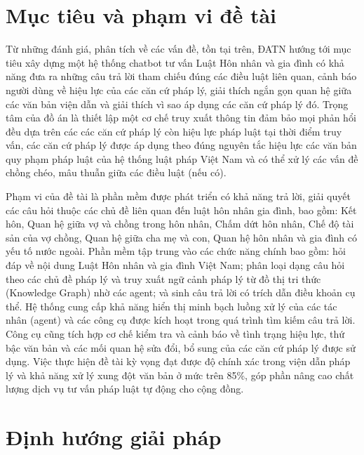 \documentclass[../DoAn.tex]{subfiles}
\begin{document}
\section{Mục tiêu và phạm vi đề tài}
\label{section:1.2}
Từ những đánh giá, phân tích về các vấn đề, tồn tại trên, ĐATN hướng tới mục tiêu xây dựng một hệ thống chatbot tư vấn Luật Hôn nhân và gia đình có khả năng đưa ra những câu trả lời tham chiếu đúng các điều luật liên quan, cảnh báo người dùng về hiệu lực của các căn cứ pháp lý, giải thích ngắn gọn quan hệ giữa các văn bản viện dẫn và giải thích vì sao áp dụng các căn cứ pháp lý đó. Trọng tâm của đồ án là thiết lập một cơ chế truy xuất thông tin đảm bảo mọi phản hổi đều dựa trên các các căn cứ pháp lý còn hiệu lực pháp luật tại thời điểm truy vấn, các căn cứ pháp lý được áp dụng theo đúng nguyên tắc hiệu lực các văn bản quy phạm pháp luật của hệ thống luật pháp Việt Nam và có thể xử lý các vấn đề chồng chéo, mâu thuẫn giữa các điều luật (nếu có).

Phạm vi của đề tài là phần mềm được phát triển có khả năng trả lời, giải quyết các câu hỏi thuộc các chủ đề liên quan đến luật hôn nhân gia đình, bao gồm: Kết hôn, Quan hệ giữa vợ và chồng trong hôn nhân, Chấm dứt hôn nhân, Chế độ tài sản của vợ chồng, Quan hệ giữa cha mẹ và con, Quan hệ hôn nhân và gia đình có yếu tố nước ngoài. Phần mềm tập trung vào các chức năng chính bao gồm: hỏi đáp về nội dung Luật Hôn nhân và gia đình Việt Nam; phân loại dạng câu hỏi theo các chủ đề pháp lý và truy xuất ngữ cảnh pháp lý từ đồ thị tri thức (Knowledge Graph) nhờ các agent; và sinh câu trả lời có trích dẫn điều khoản cụ thể. Hệ thống cung cấp khả năng hiển thị minh bạch luồng xử lý của các tác nhân (agent) và các công cụ được kích hoạt trong quá trình tìm kiếm câu trả lời. Công cụ cũng tích hợp cơ chế kiểm tra và cảnh báo về tình trạng hiệu lực, thứ bậc văn bản và các mối quan hệ sửa đổi, bổ sung của các căn cứ pháp lý được sử dụng. Việc thực hiện đề tài kỳ vọng đạt được độ chính xác trong viện dẫn pháp lý và khả năng xử lý xung đột văn bản ở mức trên 85\%, góp phần nâng cao chất lượng dịch vụ tư vấn pháp luật tự động cho cộng đồng.

\section{Định hướng giải pháp}
\label{section:1.3}
\end{document}
